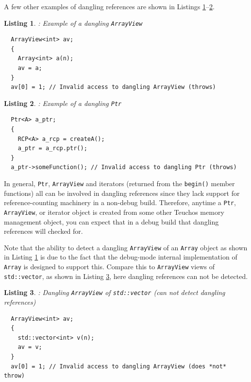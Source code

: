 \documentclass[pdf,ps2pdf,11pt]{SANDreport}
\newtheorem{listing}{Listing}
\begin{document}
A few other examples of dangling references are shown in Listings
{}\ref{listing:Array-dangling-ArrayView}--{}\ref{listing:RCP-dangling-Ptr}.

\begin{listing}: Example of a dangling {}\texttt{ArrayView} \\
\label{listing:Array-dangling-ArrayView}
{\small\begin{verbatim}
  ArrayView<int> av;
  {
    Array<int> a(n);
    av = a;
  }
  av[0] = 1; // Invalid access to dangling ArrayView (throws)
\end{verbatim}}
\end{listing}

\begin{listing}: Example of a dangling {}\texttt{Ptr} \\
\label{listing:RCP-dangling-Ptr}
{\small\begin{verbatim}
  Ptr<A> a_ptr;
  {
    RCP<A> a_rcp = createA();
    a_ptr = a_rcp.ptr();
  }
  a_ptr->someFunction(); // Invalid access to dangling Ptr (throws)
\end{verbatim}}
\end{listing}

In general, {}\texttt{Ptr}, {}\texttt{ArrayView} and iterators
(returned from the {}\texttt{begin()} member functions) all can be
involved in dangling references since they lack support for
reference-counting machinery in a non-debug build.  Therefore, anytime
a {}\texttt{Ptr}, {}\texttt{ArrayView}, or iterator object is created
from some other Teuchos memory management object, you can expect that
in a debug build that dangling references will checked for.

Note that the ability to detect a dangling {}\texttt{ArrayView} of an
{}\texttt{Array} object as shown in Listing
{}\ref{listing:Array-dangling-ArrayView} is due to the fact that the
debug-mode internal implementation of {}\texttt{Array} is designed to
support this.  Compare this to {}\texttt{ArrayView} views of
{}\texttt{std::vector}, as shown in Listing
{}\ref{listing:vector-dangling-ArrayView}, here dangling references
can not be detected.

\begin{listing}: Dangling {}\texttt{ArrayView} of {}\texttt{std::vector}
(can not detect dangling references) \\
\label{listing:vector-dangling-ArrayView}
{\small\begin{verbatim}
  ArrayView<int> av;
  {
    std::vector<int> v(n);
    av = v;
  }
  av[0] = 1; // Invalid access to dangling ArrayView (does *not* throw)
\end{verbatim}}
\end{listing}
\end{document}

